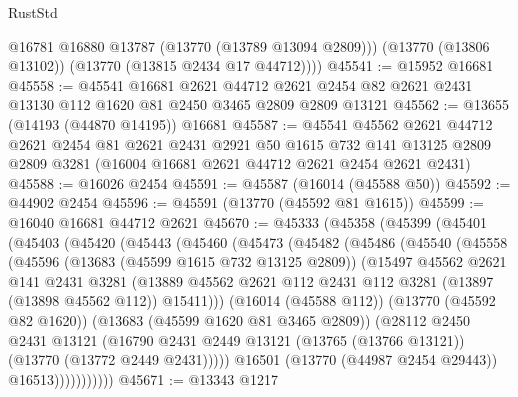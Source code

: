 \begin{lexlean}{RustStd}
\begin{coremodule}
          @16781
          @16880
          @13787
          (@13770 (@13789 @13094 @2809)))
        (@13770 (@13806 @13102))
        (@13770 (@13815 @2434 @17 @44712))))
@45541 := @15952 @16681
@45558 := @45541
    @16681
    @2621
    @44712
    @2621
    @2454
    @82
    @2621
    @2431
    @13130
    @112
    @1620
    @81
    @2450
    @3465
    @2809
    @2809
    @13121
@45562 := @13655 (@14193 (@44870 @14195)) @16681
@45587 := @45541
    @45562
    @2621
    @44712
    @2621
    @2454
    @81
    @2621
    @2431
    @2921
    @50
    @1615
    @732
    @141
    @13125
    @2809
    @2809
    @3281
    (@16004 @16681 @2621 @44712 @2621 @2454 @2621 @2431)
@45588 := @16026 @2454
@45591 := @45587 (@16014 (@45588 @50))
@45592 := @44902 @2454
@45596 := @45591 (@13770 (@45592 @81 @1615))
@45599 := @16040 @16681 @44712 @2621
@45670 := @45333
    (@45358
      (@45399
        (@45401
          (@45403
            (@45420
              (@45443
                (@45460
                  (@45473
                    (@45482
                      (@45486
                        (@45540
                          (@45558
                            (@45596
                              (@13683 (@45599 @1615 @732 @13125 @2809))
                              (@15497
                                @45562
                                @2621
                                @141
                                @2431
                                @3281
                                (@13889
                                  @45562
                                  @2621
                                  @112
                                  @2431
                                  @112
                                  @3281
                                  (@13897 (@13898 @45562 @112))
                                  @15411)))
                            (@16014 (@45588 @112))
                            (@13770 (@45592 @82 @1620))
                            (@13683 (@45599 @1620 @81 @3465 @2809))
                            (@28112
                              @2450
                              @2431
                              @13121
                              (@16790
                                @2431
                                @2449
                                @13121
                                (@13765 (@13766 @13121))
                                (@13770 (@13772 @2449 @2431)))))
                          @16501
                          (@13770 (@44987 @2454 @29443))
                          @16513)))))))))))
@45671 := @13343 @1217

\end{coremodule}
\end{lexlean}
